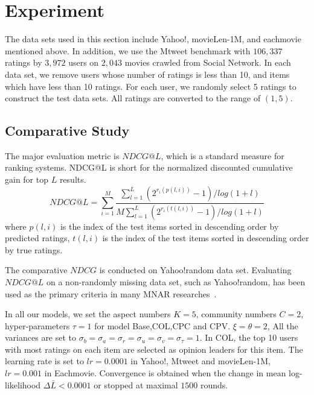 \documentclass[sigconf]{acmart}
\begin{document}
\section{Experiment}\label{sec:experiment}

The data sets used in this section include Yahoo!, movieLen-1M, and eachmovie mentioned above. In addition, we use the Mtweet benchmark with $106,337$ ratings by $3,972$ users on $2,043$ movies crawled from Social Network. In each data set, we remove users whose number of ratings is less than 10, and items which have less than 10 ratings. For each user, we randomly select 5 ratings to construct the test data sets. All ratings are converted to the range of $(1,5)$.


\subsection{Comparative Study}

The major evaluation metric is $NDCG@L$, which is a standard measure for ranking systems.   NDCG@L is short for the normalized discounted cumulative gain for top $L$ results. 
\begin{equation}
NDCG@L=\sum\limits_{i=1}^{M}\frac{\sum_{l=1}^{L}(2^{r_{i}(p(l,i))}-1)/log(1+l)}{M\sum_{l=1}^{L}(2^{r_{i}(t(l,i))}-1)/log(1+l)}
\end{equation}
where $p(l,i)$ is the index of the test items sorted in descending order by predicted ratings, $t(l,i)$ is the index of the test items sorted in descending order by true ratings.

The comparative $NDCG$ is conducted on Yahoo!random data set. Evaluating $NDCG@L$ on a non-randomly missing data set, such as Yahoo!random, has been used as the primary criteria in many MNAR researches~\cite{Hernandez-Lobato2014Probabilistic,Marlin2009Collaborative}.

In all our models, we set the aspect numbers $K=5$, community numbers $C=2$, hyper-parameters  $\tau=1$ for model Base,COL,CPC and CPV.  $\xi=\theta=2$, All the variances are set to $\sigma_b=\sigma_a=\sigma_r=\sigma_u=\sigma_v=\sigma_\tau=1$. In COL, the top 10 users with most ratings on each item are selected as opinion leaders for this item. The learning rate is set to $lr=0.0001$ in Yahoo!, Mtweet and movieLen-1M, $lr=0.001$ in Eachmovie. Convergence is obtained when the change in mean log-likelihood $\Delta\bar{L}<0.0001$ or stopped at maximal $1500$ rounds.  
\end{document}
